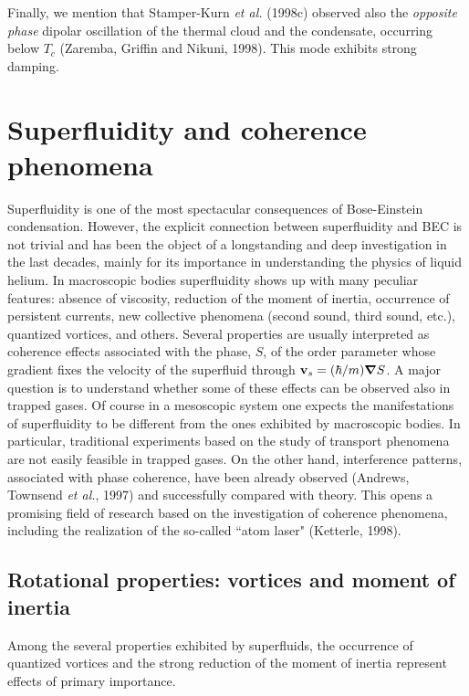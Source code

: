 Finally, we mention that Stamper-Kurn {\it et al.} (1998c) observed also 
the {\it opposite phase} dipolar oscillation of the thermal cloud 
and the condensate, occurring below $T_c$ (Zaremba, Griffin and 
Nikuni, 1998). This mode exhibits strong damping.


\section{Superfluidity and coherence phenomena}
\label{sec:superfluidity}

Superfluidity is one of the most spectacular consequences
of Bose-Einstein condensation. However, the explicit connection between
superfluidity and BEC is not trivial and has been the object of a
longstanding and deep investigation in the last decades, mainly for
its importance in  understanding the physics  of liquid helium.
In macroscopic bodies superfluidity shows up with many peculiar
features: absence of viscosity, reduction of the moment of inertia, 
occurrence of persistent currents, new collective phenomena (second
sound, third sound, etc.), quantized vortices, and others. Several 
properties are usually interpreted as coherence effects associated 
with the phase, $S$, of the order parameter whose gradient fixes 
the velocity of the superfluid through ${\bf v}_s = (\hbar/ m) 
\mbox{\boldmath$\nabla$} S$. A major question is to understand whether 
some of these effects can be observed also in trapped gases. Of course 
in a mesoscopic system one expects the manifestations of superfluidity to
be different from the ones exhibited by macroscopic bodies.
In particular, traditional experiments based on the study of transport
phenomena  are not easily feasible in trapped gases. On the other hand,
interference patterns, associated with phase coherence, have been
already observed (Andrews, Townsend {\it et al.}, 1997) and successfully
compared with theory.  This opens a promising field of research
based on the investigation of coherence phenomena,
including the realization of the so-called ``atom laser" (Ketterle, 1998).


\subsection{Rotational properties: vortices and moment of inertia}
\label{sec:rotational}

Among the several properties exhibited by superfluids,  the occurrence
of quantized vortices and the strong reduction of the moment of inertia
represent effects of primary importance.

